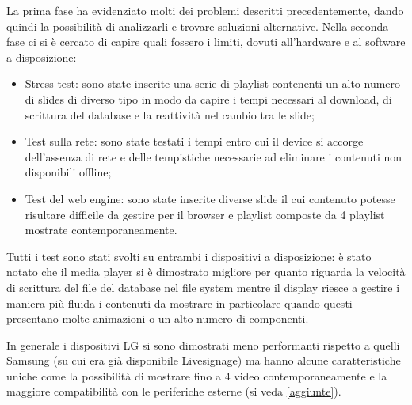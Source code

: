 La prima fase ha evidenziato molti dei problemi descritti precedentemente, dando quindi la possibilità di analizzarli e trovare soluzioni alternative.
Nella seconda fase ci si è cercato di capire quali fossero i limiti, dovuti all'hardware e al software a disposizione:
\begin{itemize}
    \item Stress test: sono state inserite una serie di playlist contenenti un alto numero di slides di diverso tipo in modo da capire i tempi necessari al download, di scrittura del database e la reattività nel cambio tra le slide;
    \item Test sulla rete: sono state testati i tempi entro cui il device si accorge dell'assenza di rete e delle tempistiche necessarie ad eliminare i contenuti non disponibili offline;
    \item Test del web engine: sono state inserite diverse slide il cui contenuto potesse risultare difficile da gestire per il browser e playlist composte da 4 playlist mostrate contemporaneamente.
\end{itemize}

Tutti i test sono stati svolti su entrambi i dispositivi a disposizione: è stato notato che il media player si è dimostrato migliore per quanto riguarda la velocità di scrittura del file del database nel file system mentre il display riesce a gestire i maniera più fluida i contenuti da mostrare in particolare quando questi presentano molte animazioni o un alto numero di componenti.

In generale i dispositivi LG si sono dimostrati meno performanti rispetto a quelli Samsung (su cui era già disponibile Livesignage) ma hanno alcune caratteristiche uniche come la possibilità di mostrare fino a 4 video contemporaneamente e la maggiore compatibilità con le periferiche esterne (si veda \ref*{aggiunte}).